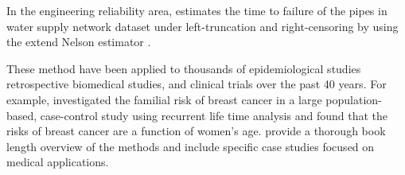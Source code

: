 \documentclass[12pt,letterpaper]{article}
\begin{document}
In the engineering reliability area, \citet{carrion2010} estimates the time to failure of the pipes in water supply network dataset under left-truncation and right-censoring by using the extend Nelson estimator \citep{pan1998}.

These method have been applied to thousands of epidemiological studies retrospective biomedical studies, and clinical trials over the past 40 years. For example, \citet{claus1991} investigated the familial risk of breast cancer in a large population-based, case-control study using recurrent life time analysis and found that the risks of breast cancer are a function of women's age.  \citet{Kleinmoeschberger2003} provide a thorough book length overview of the methods and include specific case studies focused on medical applications.

\end{document}

